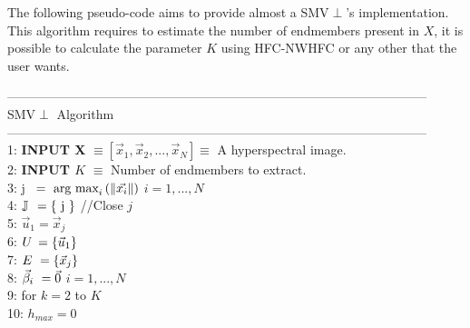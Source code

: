 \documentclass[11pt, oneside]{Thesis} %
\begin{document}
\label{SubsectionGeneralAlgorithm}

The following pseudo-code aims to provide almost a SMV$\perp$'s implementation. 
This algorithm requires to estimate the number of endmembers present 
in $X$, it is possible to calculate the parameter $K$ using HFC-NWHFC 
\cite{HFC-NWHFC} or any other that the user wants.
\begin{flushleft}
\noindent---------------------------------------------------------------------------------------------------\\
\hspace{4.5cm}SMV$\perp$ Algorithm
\noindent---------------------------------------------------------------------------------------------------\\

1: \textbf{INPUT X} $\equiv \left[ \vec{x}_{1}, \vec{x}_{2}, ..., \vec{x}_{N} \right] \equiv $ A hyperspectral image.\\
2: \textbf{INPUT $K$} $\equiv$ Number of endmembers to extract.\\
3:  \hspace{0.3cm}j $\hspace{1.5mm} = \text{ arg max}_{i} \left( \Vert \vec{x_{i}} \Vert 
\right)$ \hspace{1.67cm}\small{$i = 1,...,N$}\\
4:  \hspace{0.3cm}$\mathbb{J} \hspace{1.5mm} = \lbrace \text{ j } \rbrace $ 
\hspace{3.6cm} //Close $j$\\
5:  \hspace{0.3cm}$\vec{u}_1 = \vec{x}_{j}$\\
6:  \hspace{0.3cm}$U \hspace{0.7mm} = \lbrace \vec{u}_1 \rbrace$\\
7:  \hspace{0.3cm}$E \hspace{1.2mm} = \lbrace \vec{x}_j \rbrace$\\
8:  \hspace{0.25cm}$\vec{\beta}_{i} \hspace{1.2mm} = \vec{0}$\hspace{4.2cm} 
\small{$i = 1,...,N$}\\
9:  \hspace{0.21cm}for $k=2$ to $K$\\
10:  \hspace{0.8cm}$h_{max} = 0$\\

\end{flushleft}
\end{document}
